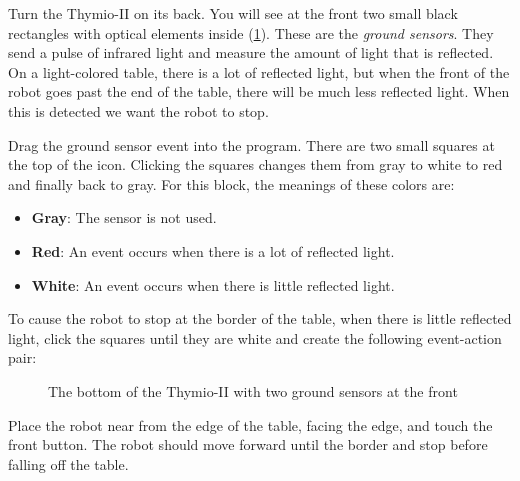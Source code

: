 
Turn the Thymio-II on its back. You will see at the front two small
black rectangles with optical elements inside (\cref{fig.bottom}).
These are the \emph{ground sensors}.
They send a pulse of infrared light and measure the amount of light that is reflected.
On a light-colored table, there is a
lot of reflected light, but when the front of the robot goes past the
end of the table, there will be much less reflected light. When this is
detected we want the robot to stop.


Drag the ground sensor event  into the program. There
are two small squares at the top of the icon. Clicking the squares
changes them from gray to white to red and finally back to gray.
For this block, the meanings of these colors are:

\begin{itemize}
\item \textbf{Gray}: The sensor is not used.
\item \textbf{Red}: An event occurs when there is a lot of reflected light.
\item \textbf{White}: An event occurs when there is little reflected light.
\end{itemize}


To cause the robot to stop at the border of the table, when there is little reflected light, click
the squares until they are white and create the following event-action pair:

\begin{figure}
\begin{center}
\caption{The bottom of the Thymio-II with two ground sensors at the
 front}\label{fig.bottom}
\end{center}
\end{figure}

Place the robot near from the edge of the table, facing the edge, and touch the front button.
The robot should move forward until the border and stop before falling off the table.


